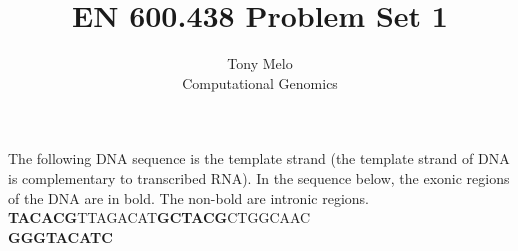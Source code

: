 \documentclass[12pt]{article}
\newenvironment{problem}[2][Problem]{\begin{trivlist}
\item[\hskip \labelsep {\bfseries #1}\hskip \labelsep {\bfseries #2.}]}{\end{trivlist}}
\begin{document}
 
 
\title{EN 600.438 Problem Set 1}
\author{Tony Melo\\ Computational Genomics}					 
 
\maketitle
 
\begin{problem}{1}
The following DNA sequence is the template strand (the template strand of DNA is complementary
to transcribed RNA). In the sequence below, the exonic regions of the DNA are
in bold. The non-bold are intronic regions.
\textbf{TACACG}TTAGACAT\textbf{GCTACG}CTGGCAAC\\\textbf{GGGTACATC}
\end{problem}
\end{document}
